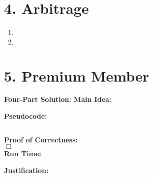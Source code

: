 \documentclass[11pt]{article}
\def\endproofmark{$\Box$}
\newenvironment{FourPartSolution}{\par{\bf Four-Part Solution:}}{\smallskip}
\newenvironment{mainIdea}{{\bf Main Idea:}}{\smallskip}
\newenvironment{pseudocode}{\par{\bf Pseudocode:}}{\smallskip}
\newenvironment{proofOfCorrectness}{\par{\bf Proof of Correctness:}}{\endproofmark\smallskip}
\newenvironment{runTime}{{\bf Run Time:}}{\smallskip}
\newenvironment{justification}{\par{\bf Justification:}}{\smallskip}
\begin{document}
\newpage
\section*{4. Arbitrage}
\begin{enumerate}[label=(\alph*)]
\item


\item


\end{enumerate}




\newpage
\section*{5. Premium Member}
\begin{FourPartSolution}
\begin{mainIdea}
\\

\end{mainIdea}

\begin{pseudocode}
\begin{lstlisting}

\end{lstlisting}
\end{pseudocode}
\begin{proofOfCorrectness}
\\

\end{proofOfCorrectness}
\\
\begin{runTime}
\\

\end{runTime}

\begin{justification}
\\

\end{justification}
\end{FourPartSolution}
\end{document}
